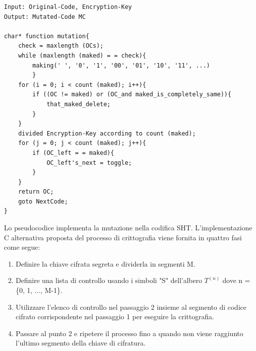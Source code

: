 \documentclass[a4paper]{report} %
\begin{document}
\begin{lstlisting}
Input: Original-Code, Encryption-Key
Output: Mutated-Code MC

char* function mutation{
	check = maxlength (OCs);
	while (maxlength (maked) = = check){
		making(' ', '0', '1', '00', '01', '10', '11', ...)
		}
	for (i = 0; i < count (maked); i++){
		if ((OC != maked) or (OC_and maked_is_completely_same)){
			that_maked_delete;
		}
	}
	divided Encryption-Key according to count (maked);
	for (j = 0; j < count (maked); j++){
		if (OC_left = = maked){
			OC_left's_next = toggle;
		}
	}
	return OC;
	goto NextCode;
}
\end{lstlisting}

Lo pseudocodice implementa la mutazione nella codifica SHT. L'implementazione C alternativa proposta del processo di crittografia viene fornita in quattro fasi come segue:
\begin{enumerate}
\item Definire la chiave cifrata segreta e dividerla in segmenti M.
\item Definire una lista di controllo usando i simboli "S" dell'albero $T^{(n)}$ dove n = \{0, 1, ..., M-1\}.
\item Utilizzare l'elenco di controllo nel passaggio 2 insieme al segmento di codice cifrato corrispondente nel passaggio 1 per eseguire la crittografia.
\item Passare al punto 2 e ripetere il processo fino a quando non viene raggiunto l'ultimo segmento della chiave di cifratura.
\end{enumerate}
\end{document}
